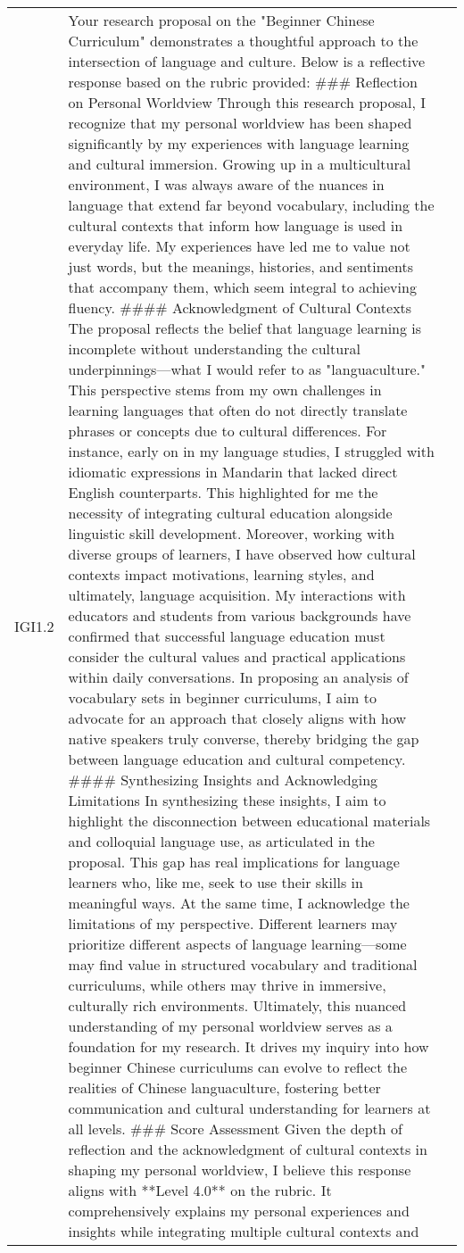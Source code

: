 \begin{longtable}{|p{}|p{}|p{}|}
IGI1.2 & Your research proposal on the "Beginner Chinese Curriculum" demonstrates a thoughtful approach to the intersection of language and culture. Below is a reflective response based on the rubric provided:  \#\#\# Reflection on Personal Worldview  Through this research proposal, I recognize that my personal worldview has been shaped significantly by my experiences with language learning and cultural immersion. Growing up in a multicultural environment, I was always aware of the nuances in language that extend far beyond vocabulary, including the cultural contexts that inform how language is used in everyday life. My experiences have led me to value not just words, but the meanings, histories, and sentiments that accompany them, which seem integral to achieving fluency.   \#\#\#\# Acknowledgment of Cultural Contexts  The proposal reflects the belief that language learning is incomplete without understanding the cultural underpinnings—what I would refer to as "languaculture." This perspective stems from my own challenges in learning languages that often do not directly translate phrases or concepts due to cultural differences. For instance, early on in my language studies, I struggled with idiomatic expressions in Mandarin that lacked direct English counterparts. This highlighted for me the necessity of integrating cultural education alongside linguistic skill development.  Moreover, working with diverse groups of learners, I have observed how cultural contexts impact motivations, learning styles, and ultimately, language acquisition. My interactions with educators and students from various backgrounds have confirmed that successful language education must consider the cultural values and practical applications within daily conversations. In proposing an analysis of vocabulary sets in beginner curriculums, I aim to advocate for an approach that closely aligns with how native speakers truly converse, thereby bridging the gap between language education and cultural competency.  \#\#\#\# Synthesizing Insights and Acknowledging Limitations  In synthesizing these insights, I aim to highlight the disconnection between educational materials and colloquial language use, as articulated in the proposal. This gap has real implications for language learners who, like me, seek to use their skills in meaningful ways. At the same time, I acknowledge the limitations of my perspective. Different learners may prioritize different aspects of language learning—some may find value in structured vocabulary and traditional curriculums, while others may thrive in immersive, culturally rich environments.   Ultimately, this nuanced understanding of my personal worldview serves as a foundation for my research. It drives my inquiry into how beginner Chinese curriculums can evolve to reflect the realities of Chinese languaculture, fostering better communication and cultural understanding for learners at all levels.  \#\#\# Score Assessment  Given the depth of reflection and the acknowledgment of cultural contexts in shaping my personal worldview, I believe this response aligns with **Level 4.0** on the rubric. It comprehensively explains my personal experiences and insights while integrating multiple cultural contexts and 
\end{longtable}
